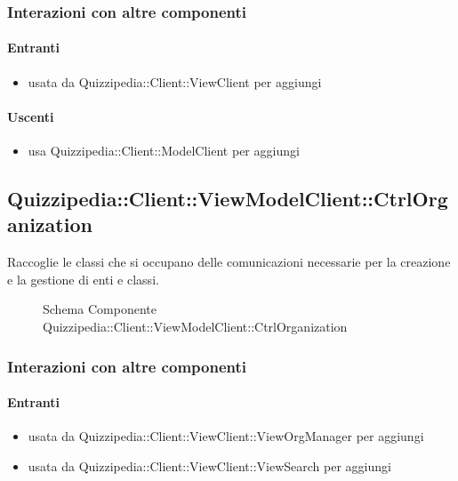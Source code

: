 \subsubsection{Interazioni con altre componenti}
\paragraph{Entranti}
\begin{itemize}
\item usata da Quizzipedia::Client::ViewClient per aggiungi
\end{itemize}
\paragraph{Uscenti}
\begin{itemize}
\item usa Quizzipedia::Client::ModelClient per aggiungi
\end{itemize}
\subsection{Quizzipedia::Client::ViewModelClient::CtrlOrganization}
Raccoglie le classi che si occupano delle comunicazioni necessarie per la creazione e la gestione di enti e classi.
\begin{figure}[H]
\centering
\noindent{}
\caption[Schema Componente Quizzipedia::Client::ViewModelClient::CtrlOrganization]{Schema Componente Quizzipedia::Client::ViewModelClient::CtrlOrganization}
\end{figure}
\subsubsection{Interazioni con altre componenti}
\paragraph{Entranti}
\begin{itemize}
\item usata da Quizzipedia::Client::ViewClient::ViewOrgManager per aggiungi
\item usata da Quizzipedia::Client::ViewClient::ViewSearch per aggiungi
\end{itemize}
